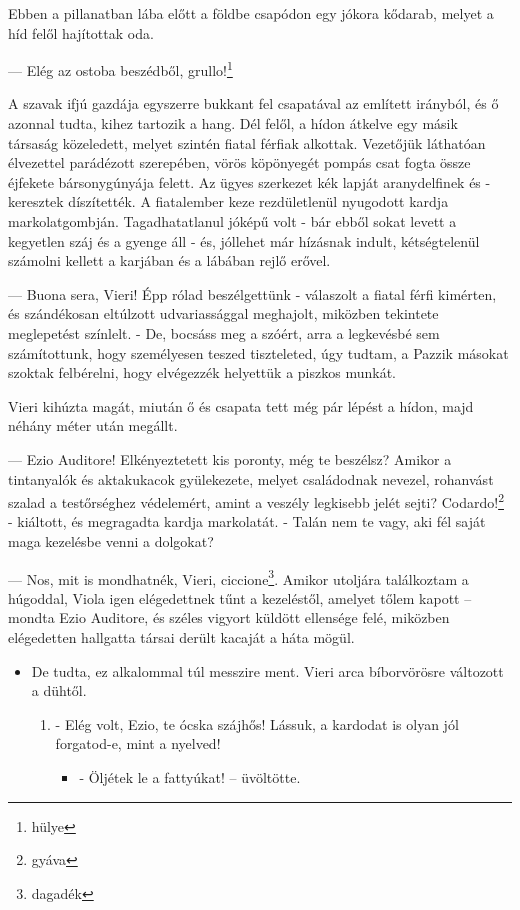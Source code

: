 \documentclass[12pt, a4paper, twoside]{report}
\theoremstyle{definition}
\theoremstyle{remark}
\begin{document}
Ebben  a  pillanatban  lába  előtt  a  földbe  csapódon  egy  jókora 
kődarab, melyet a híd felől hajítottak oda. 

— Elég az ostoba beszédből, grullo!\footnote{hülye}

A szavak ifjú gazdája egyszerre bukkant fel csapatával az említett 
irányból, és ő azonnal tudta, kihez tartozik a hang. Dél felől, a hídon átkelve egy másik társaság közeledett, melyet szintén fiatal férfiak 
alkottak. Vezetőjük láthatóan élvezettel parádézott szerepében, vörös 
köpönyegét pompás csat fogta össze éjfekete bársonygúnyája felett. 
Az ügyes szerkezet kék lapját aranydelfinek és -keresztek díszítették. 
A fiatalember keze rezdületlenül nyugodott kardja markolatgombján. 
Tagadhatatlanul jóképű volt - bár ebből sokat levett a kegyetlen száj 
és  a  gyenge  áll - és,  jóllehet  már  hízásnak  indult,  kétségtelenül 
számolni kellett a karjában és a lábában rejlő erővel. 

— Buona sera, Vieri! Épp rólad beszélgettünk - válaszolt a fiatal 
férfi  kimérten,  és  szándékosan  eltúlzott  udvariassággal  meghajolt, 
miközben tekintete meglepetést színlelt. - De, bocsáss meg a szóért, 
arra  a  legkevésbé  sem  számítottunk,  hogy  személyesen  teszed 
tiszteleted, úgy tudtam, a Pazzik másokat szoktak felbérelni, hogy 
elvégezzék helyettük a piszkos munkát. 

Vieri kihúzta  magát, miután ő és csapata tett még pár  lépést a 
hídon, majd néhány méter után megállt. 

— Ezio  Auditore!  Elkényeztetett  kis  poronty,  még  te  beszélsz? 
Amikor  a  tintanyalók  és  aktakukacok  gyülekezete,  melyet 
családodnak  nevezel,  rohanvást  szalad  a  testőrséghez  védelemért, 
amint  a  veszély  legkisebb  jelét  sejti?  Codardo!\footnote{gyáva}  -  kiáltott,  és 
megragadta kardja  markolatát. - Talán  nem te vagy, aki  fél  saját 
maga kezelésbe venni a dolgokat? 

— Nos,  mit  is  mondhatnék,  Vieri,  ciccione\footnote{dagadék}.  Amikor  utoljára 
találkoztam a húgoddal, Viola igen elégedettnek tűnt a kezeléstől, 
amelyet  tőlem  kapott  -- mondta  Ezio  Auditore,  és  széles  vigyort 
küldött ellensége felé, miközben elégedetten hallgatta társai derült 
kacaját a háta mögül. 

\begin{itemize}
    \item De  tudta, ez alkalommal túl messzire  ment. Vieri arca bíborvörösre változott a dühtől. 
    \begin{enumerate}
        \item - Elég volt, Ezio, te ócska szájhős! Lássuk, a kardodat is olyan jól forgatod-e, mint a nyelved!
        \begin{itemize}
            \item - Öljétek le a fattyúkat! -- üvöltötte.
        \end{itemize}
    \end{enumerate}
\end{itemize}
\end{document}
